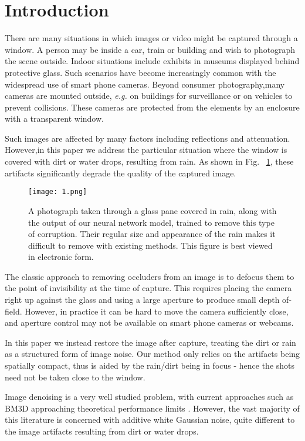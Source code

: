 \documentclass[10pt,twocolumn,letterpaper]{article}
\begin{document}
\section{Introduction}
There are many situations in which images or video might be captured through a window. A person may be inside a car, train or building and wish to photograph the scene outside. Indoor situations include exhibits in museums displayed behind protective glass. Such scenarios have become increasingly common with the widespread use of smart phone cameras. Beyond consumer photography,many cameras are mounted outside, \emph{e.g.} on buildings for surveillance or on vehicles to prevent collisions. These cameras are protected from the elements by an enclosure with a transparent window.
\par
Such images are affected by many factors including reflections and attenuation. However,in this paper we address the particular situation where the window is covered with dirt or water drops, resulting from rain. As shown in Fig. ~\ref{fig1}, these artifacts significantly degrade the quality of the captured image.
\begin{figure}[htbp]
  \centering
  \texttt{[image: 1.png]}
  \caption{A photograph taken through a glass pane covered in rain, along with the output of our neural network model, trained to remove this type of corruption. Their regular size and appearance of the rain makes it difficult to remove with existing methods. This figure is best viewed in electronic form.
}\label{fig1}
\end{figure}
\par
The classic approach to removing occluders from an image is to defocus them to the point of invisibility at the time of capture. This requires placing the camera right up against the glass and using a large aperture to produce small depth of-field. However, in practice it can be hard to move the camera sufficiently close, and aperture control may not be available on smart phone cameras or webcams.
\par
In this paper we instead restore the image after capture, treating the dirt or rain as a structured form of image noise. Our method only relies on the artifacts being spatially compact, thus is aided by the rain/dirt being in focus - hence the shots need not be taken close to the window.
\par
Image denoising is a very well studied problem, with current approaches such as BM3D \cite{Image2012} approaching theoretical performance limits \cite{Natural2011}. However, the vast majority of this literature is concerned with additive white Gaussian noise, quite different to the image artifacts resulting from dirt or water drops.
\end{document}
